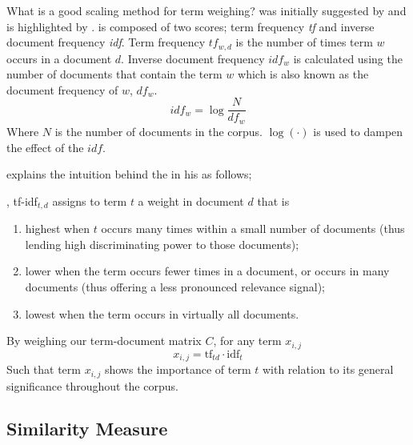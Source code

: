 What is a good scaling method for term weighing?
\tfidf{} was initially suggested by \textcite{jones_statistical_1972} and is highlighted by \textcite{manning_introduction_2009}.
\tfidf{} is composed of two scores; term frequency \emph{tf} and inverse document frequency \emph{idf}.
Term frequency $tf_{w,d}$ is the number of times term $w$ occurs in a document $d$.
Inverse document frequency $idf_{w}$ is calculated using the number of documents that contain the term $w$ which is also known as the document frequency of $w$, $df_w$.
\begin{equation}
    idf_w = \log{\frac{N}{df_w}}
\end{equation}
Where $N$ is the number of documents in the corpus. $\log(\cdot)$ is used to dampen the effect of the $idf$.

\citeauthor{manning_introduction_2009} explains the intuition behind the \tfidf{} in his  as follows;
\begin{displayquote}
    \textelp{}, tf-idf$_{t,d}$ assigns to term $t$ a weight in document $d$ that is
    \begin{enumerate}
        \item highest when $t$ occurs many times within a small number of documents (thus lending high discriminating power to those documents);
        \item lower when the term occurs fewer times in a document, or occurs in many documents (thus offering a less pronounced relevance signal);
        \item lowest when the term occurs in virtually all documents.
    \end{enumerate}
\end{displayquote}
By weighing our term-document matrix $C$, for any term $x_{i,j}$
\begin{equation}
x_{i,j} = \text{tf}_{td} \cdot \text{idf}_{t} \end{equation}
Such that term $x_{i,j}$ shows the importance of term $t$ with relation to its general significance throughout the corpus.


\subsection{Similarity Measure}%
\label{sub:similarity_measure}

